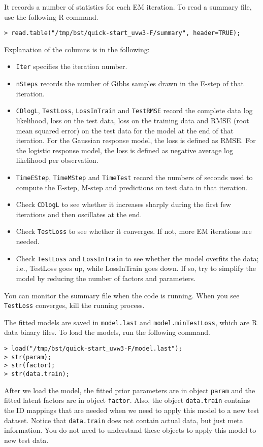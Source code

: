 It records a number of statistics for each EM iteration.  To read a summary file, use the following R command.
{\small\begin{verbatim}
> read.table("/tmp/bst/quick-start_uvw3-F/summary", header=TRUE);
\end{verbatim}}
\noindent Explanation of the columns is in the following:
\begin{itemize}
\item {\tt Iter} specifies the iteration number.
\item {\tt nSteps} records the number of Gibbs samples drawn in the E-step of that iteration.
\item {\tt CDlogL}, {\tt TestLoss}, {\tt LossInTrain} and {\tt TestRMSE} record the complete data log likelihood, loss on the test data, loss on the training data and RMSE (root mean squared error) on the test data for the model at the end of that iteration.  For the Gaussian response model, the loss is defined as RMSE.  For the logistic response model, the loss is defined as negative average log likelihood per observation.
\item {\tt TimeEStep}, {\tt TimeMStep} and {\tt TimeTest} record the numbers of seconds used to compute the E-step, M-step and predictions on test data in that iteration.
\end{itemize}

\begin{itemize}
\item Check {\tt CDlogL} to see whether it increases sharply during the first few iterations and then oscillates at the end.
\item Check {\tt TestLoss} to see whether it converges.  If not, more EM iterations are needed.
\item Check {\tt TestLoss} and {\tt LossInTrain} to see whether the model overfits the data; i.e., TestLoss goes up, while LossInTrain goes down.  If so, try to simplify the model by reducing the number of factors and parameters.
\end{itemize}
You can monitor the summary file when the code is running.  When you see {\tt TestLoss} converges, kill the running process.

The fitted models are saved in {\tt model.last} and {\tt model.minTestLoss}, which are R data binary files.  To load the models, run the following command.
{\small\begin{verbatim}
> load("/tmp/bst/quick-start_uvw3-F/model.last");
> str(param);
> str(factor);
> str(data.train);
\end{verbatim}}
\noindent After we load the model, the fitted prior parameters are in object {\tt param} and the fitted latent factors are in object {\tt factor}.  Also, the object {\tt data.train} contains the ID mappings that are needed when we need to apply this model to a new test dataset.  Notice that {\tt data.train} does not contain actual data, but just meta information.  You do not need to understand these objects to apply this model to new test data.

